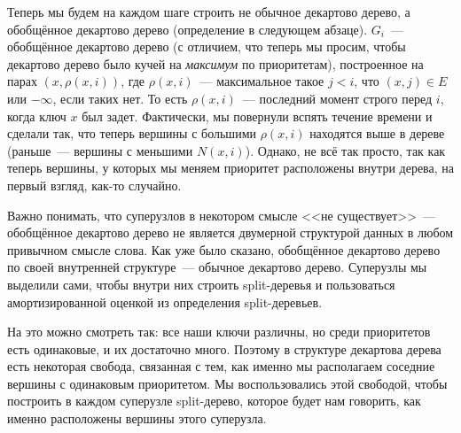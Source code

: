 Теперь мы будем на каждом шаге строить не обычное декартово дерево, а обобщённое декартово дерево (определение в следующем абзаце). $G_i$~---
обобщённое декартово дерево (с отличием, что теперь мы просим, чтобы декартово дерево было кучей на \emph{максимум} по приоритетам), построенное на парах $(x, \rho(x, i))$, где $\rho(x, i)$~--- максимальное такое $j < i$, что $(x, j) \in E$ или $-\infty$, если таких нет. То есть $\rho(x, i)$~--- последний момент строго перед $i$, когда ключ $x$ был задет. Фактически, мы повернули вспять течение времени и сделали так, что теперь вершины с большими $\rho(x, i)$ находятся выше в дереве (раньше~--- вершины с меньшими $N(x, i)$). Однако, не всё так просто, так как теперь вершины, у которых мы меняем приоритет расположены внутри дерева, на первый взгляд, как-то случайно.


\begin{remark} Важно понимать, что суперузлов в некотором смысле <<не существует>>~--- обобщённое декартово дерево не является двумерной структурой данных в любом привычном смысле слова. Как уже было сказано, обобщённое декартово дерево по своей внутренней структуре~--- обычное декартово дерево.
	Суперузлы мы выделили сами, чтобы внутри них строить split-деревья и пользоваться амортизированной оценкой из определения split-деревьев.

	На это можно смотреть так: все наши ключи различны, но среди приоритетов есть одинаковые, и их достаточно много. Поэтому в структуре декартова дерева есть некоторая свобода, связанная с тем, как именно мы располагаем соседние вершины с одинаковым приоритетом. Мы воспользовались этой свободой, чтобы построить в каждом суперузле split-дерево, которое будет нам говорить, как именно расположены вершины этого суперузла.
\end{remark}

